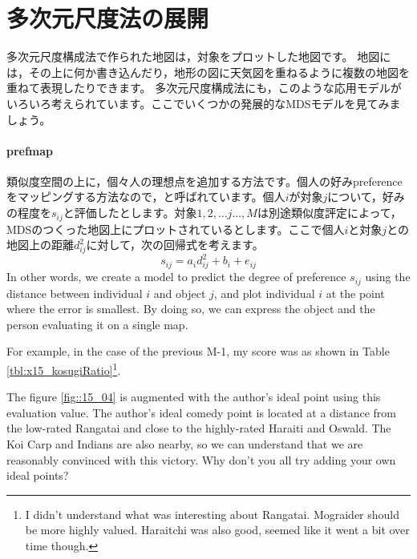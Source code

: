 \documentclass{ltjsbook}
\begin{document}
\section{多次元尺度法の展開}
多次元尺度構成法で作られた地図は，対象をプロットした地図です。
地図には，その上に何か書き込んだり，地形の図に天気図を重ねるように複数の地図を重ねて表現したりできます。
多次元尺度構成法にも，このような応用モデルがいろいろ考えられています。ここでいくつかの発展的なMDSモデルを見てみましょう。

\paragraph{prefmap}類似度空間の上に，個々人の理想点を追加する方法です。個人の好みpreferenceをマッピングする方法なので，と呼ばれています。個人$i$が対象$j$について，好みの程度を$s_{ij}$と評価したとします。対象$1,2,...j...,M$は別途類似度評定によって，MDSのつくった地図上にプロットされているとします。ここで個人$i$と対象$j$との地図上の距離$d_{ij}^2$に対して，次の回帰式を考えます。
\[ s_{ij} = a_i d_{ij}^2 + b_i + e_{ij} \]
In other words, we create a model to predict the degree of preference $s_{ij}$ using the distance between individual $i$ and object $j$, and plot individual $i$ at the point where the error is smallest. By doing so, we can express the object and the person evaluating it on a single map.

For example, in the case of the previous M-1, my score was as shown in Table \ref{tbl:x15_kosugiRatio}\footnote{I didn't understand what was interesting about Rangatai. Mograider should be more highly valued. Haraitchi was also good, seemed like it went a bit over time though.}.

The figure \ref{fig::15_04} is augmented with the author's ideal point using this evaluation value. The author's ideal comedy point is located at a distance from the low-rated Rangatai and close to the highly-rated Haraiti and Oswald. The Koi Carp and Indians are also nearby, so we can understand that we are reasonably convinced with this victory. Why don't you all try adding your own ideal points?

\end{document}
